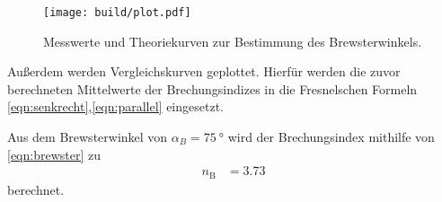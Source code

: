\begin{figure}[H]
  \centering
  \texttt{[image: build/plot.pdf]}
  \caption {Messwerte und Theoriekurven zur Bestimmung des Brewsterwinkels.}
  \label{fig:plot1}
\end{figure}

Außerdem werden Vergleichskurven geplottet. Hierfür werden die zuvor berechneten Mittelwerte der Brechungsindizes in die Fresnelschen
Formeln \eqref{eqn:senkrecht},\eqref{eqn:parallel} eingesetzt.

Aus dem Brewsterwinkel von $\alpha_B = \qty{75}{\degree}$ wird der Brechungsindex mithilfe von \autoref{eqn:brewster}
zu
\begin{align*}
  n_{\text{B}}&= 3.73 
\end{align*}
berechnet.







